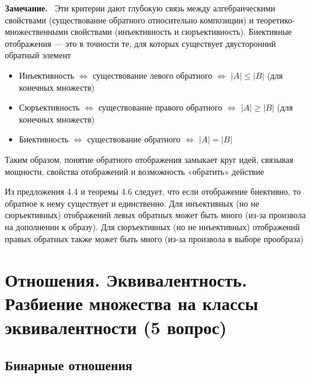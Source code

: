 \documentclass[a4paper,12pt]{article}
\newcommand{\myremark}{\textbf{Замечание.}\ }
\theoremstyle{definition}
\theoremstyle{plain}
\theoremstyle{remark}
\begin{document}
	\myremark
	Эти критерии дают глубокую связь между алгебраическими свойствами (существование обратного относительно композиции) и теоретико-множественными свойствами (инъективность и сюръективность). Биективные отображения — это в точности те, для которых существует двусторонний обратный элемент
	
	\begin{tcolorbox}[colback=purple!5, colframe=purple!50!black, title=Заметочка: Связь с предыдущими темами]
		\begin{itemize}
			\item Инъективность $\Leftrightarrow$ существование левого обратного $\Leftrightarrow$ $|A| \leq |B|$ (для конечных множеств)
			\item Сюръективность $\Leftrightarrow$ существование правого обратного $\Leftrightarrow$ $|A| \geq |B|$ (для конечных множеств)
			\item Биективность $\Leftrightarrow$ существование обратного $\Leftrightarrow$ $|A| = |B|$
		\end{itemize}
		Таким образом, понятие обратного отображения замыкает круг идей, связывая мощности, свойства отображений и возможность «обратить» действие
	\end{tcolorbox}
	
	\begin{tcolorbox}[colback=yellow!5, colframe=orange!60!black, title=Важное замечание о единственности]
		Из предложения 4.4 и теоремы 4.6 следует, что если отображение биективно, то обратное к нему существует и единственно. Для инъективных (но не сюръективных) отображений левых обратных может быть много (из-за произвола на дополнении к образу). Для сюръективных (но не инъективных) отображений правых обратных также может быть много (из-за произвола в выборе прообраза)
	\end{tcolorbox}
	
	
	
	
	
	
	
	
	
	
	
	
	
	
	\newpage
	\section{Отношения. Эквивалентность. Разбиение множества на классы эквивалентности (5 вопрос)}
	
	\subsection{Бинарные отношения}
	
\end{document}
